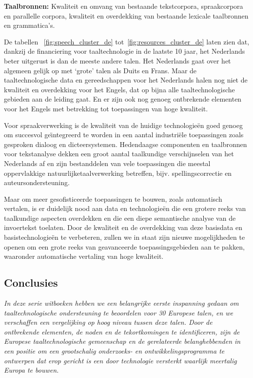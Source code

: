 \documentclass[]{../../metanetpaper}
\begin{document}
\begin{multicols}{2}
\textbf{Taalbronnen:} Kwaliteit en omvang van bestaande tekstcorpora, spraakcorpora en parallelle corpora, kwaliteit en overdekking van bestaande lexicale taalbronnen en grammatica's.


De tabellen ~\ref{fig:speech_cluster_de} tot~\ref{fig:resources_cluster_de}  laten zien dat, dankzij de financiering voor taaltechnologie in de laatste 10 jaar, het Nederlands beter uitgerust is dan de meeste andere talen. Het Nederlands gaat over het algemeen gelijk op met `grote' talen als Duits en Frans. Maar de taaltechnologische data en gereedschappen voor het Nederlands halen nog niet de kwaliteit en overdekking voor het Engels, dat op bijna alle taaltechnologische gebieden aan de leiding gaat. En er zijn ook nog genoeg ontbrekende elementen voor het Engels met betrekking tot toepassingen van hoge kwaliteit.

   Voor spraakverwerking is de kwaliteit van de huidige technologie{\"e}n goed genoeg om succesvol ge{\"\i}ntegreerd te worden in een aantal industri{\"e}le toepassingen zoals gesproken dialoog en dicteersystemen. Hedendaagse componenten en taalbronnen voor tekstanalyse dekken een groot aantal taalkundige verschijnselen van het Nederlands af en zijn bestanddelen van vele toepassingen die meestal oppervlakkige natuurlijketaalverwerking betreffen, bijv. spellingscorrectie en auteursondersteuning.

   Maar om meer gesofisticeerde toepassingen te bouwen, zoals automatisch vertalen, is er duidelijk nood aan data en technologie{\"e}n die een grotere reeks van taalkundige aspecten overdekken en die een diepe semantische analyse van de invoertekst toelaten. Door de kwaliteit en de overdekking van deze basisdata en basistechnologie{\"e}n te verbeteren, zullen we in staat zijn nieuwe mogelijkheden te openen om een grote reeks van geavanceerde toepassingsgebieden aan te pakken, waaronder automatische vertaling van hoge kwaliteit.


\subsection{Conclusies}

\emph{In deze serie witboeken hebben we een belangrijke eerste inspanning gedaan om taaltechnologische ondersteuning te beoordelen voor 30 Europese talen, en we verschaffen een vergelijking op hoog niveau tussen deze talen. Door de ontbrekende elementen, de noden en de tekortkomingen te identificeren, zijn de Europese taaltechnologische gemeenschap en de gerelateerde belanghebbenden in een positie om een grootschalig onderzoeks- en ontwikkelingsprogramma te ontwerpen dat erop gericht is een door technologie versterkt waarlijk meertalig Europa te bouwen.}


\end{multicols}
\end{document}
